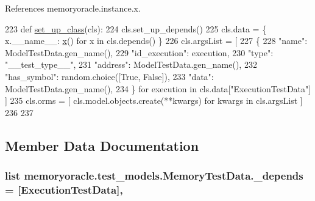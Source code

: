 References memoryoracle.\+instance.\+x.


\begin{DoxyCode}
223     \textcolor{keyword}{def }\hyperlink{classmemoryoracle_1_1test__models_1_1MemoryTestData_a20a34b92eed5df20347ac179810d1714}{set\_up\_class}(cls):
224         cls.set\_up\_depends()
225         cls.data = \{ x.\_\_name\_\_: \hyperlink{namespacememoryoracle_1_1instance_afe036cc8dc71469743d090c4c80d50c5}{x}() \textcolor{keywordflow}{for} x \textcolor{keywordflow}{in} cls.depends() \}
226         cls.argsList = [
227                 \{
228                     \textcolor{stringliteral}{"name"}: ModelTestData.gen\_name(),
229                     \textcolor{stringliteral}{"id\_execution"}: execution,
230                     \textcolor{stringliteral}{"type"}: \textcolor{stringliteral}{"\_\_test\_type\_\_"},
231                     \textcolor{stringliteral}{"address"}: ModelTestData.gen\_name(),
232                     \textcolor{stringliteral}{"has\_symbol"}: random.choice([\textcolor{keyword}{True}, \textcolor{keyword}{False}]),
233                     \textcolor{stringliteral}{"data"}: ModelTestData.gen\_name(),
234                 \} \textcolor{keywordflow}{for} execution \textcolor{keywordflow}{in} cls.data[\textcolor{stringliteral}{"ExecutionTestData"}] ]
235         cls.orms = [ cls.model.objects.create(**kwargs) \textcolor{keywordflow}{for} kwargs \textcolor{keywordflow}{in} cls.argsList ]
236 
237 
\end{DoxyCode}


\subsection{Member Data Documentation}
\hypertarget{classmemoryoracle_1_1test__models_1_1MemoryTestData_a0a475580e4e48710f602010fb935fc3f}{}
\subsubsection[{\+\_\+depends}]{\setlength{\rightskip}{0pt plus 5cm}list memoryoracle.\+test\+\_\+models.\+Memory\+Test\+Data.\+\_\+depends = \mbox{[}{\bf Execution\+Test\+Data}\mbox{]}\hspace{0.3cm}{\ttfamily [static]}, {\ttfamily [private]}}\label{classmemoryoracle_1_1test__models_1_1MemoryTestData_a0a475580e4e48710f602010fb935fc3f}


